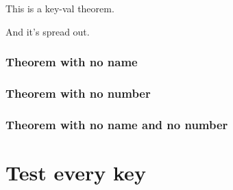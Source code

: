 \begin{theorem}[name=Keyed theorem,
label=thm:key]
This is a
key-val theorem.
\end{theorem}
\begin{theorem}[continues=thm:key]
And it’s spread out.
\end{theorem}

\subsection{Theorem with no name}

\begin{noname}
\kant[2][1]
\end{noname}

\begin{noname}[heading]
\kant[2][1]
\end{noname}

\subsection{Theorem with no number}

\begin{euclid}
\kant[2][1]
\end{euclid}

\begin{euclid}[heading]
\kant[2][1]
\end{euclid}

\subsection{Theorem with no name and no number}

\begin{nonamenonumber}
\kant[2][1]
\end{nonamenonumber}

\begin{nonamenonumber}[heading]
\kant[2][1]
\end{nonamenonumber}

\chapter{Test every key}

\PrintTheorems

\listofkeytheorems